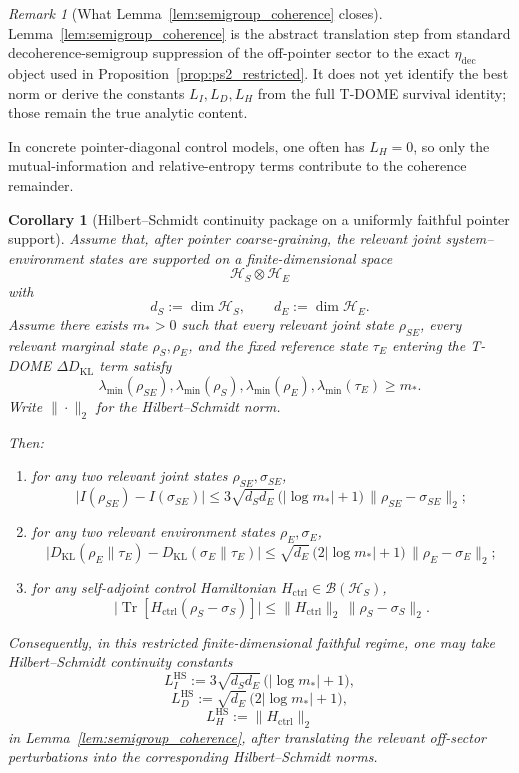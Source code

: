 \documentclass[12pt]{article}
\newtheorem{corollary}[theorem]{Corollary}
\theoremstyle{definition}
\theoremstyle{remark}
\newtheorem{remark}[theorem]{Remark}
\begin{document}
\begin{remark}[What Lemma~\ref{lem:semigroup_coherence} closes]
Lemma~\ref{lem:semigroup_coherence} is the abstract translation step
from standard decoherence-semigroup suppression of the off-pointer
sector to the exact \(\eta_{\mathrm{dec}}\) object used in
Proposition~\ref{prop:ps2_restricted}. It does not yet identify the
best norm or derive the constants \(L_I,L_D,L_H\) from the full
T-DOME survival identity; those remain the true analytic content.

In concrete pointer-diagonal control models, one often has
\(L_H=0\), so only the mutual-information and relative-entropy terms
contribute to the coherence remainder.
\end{remark}

\begin{corollary}[Hilbert--Schmidt continuity package on a uniformly faithful pointer support]\label{cor:hs_package}
Assume that, after pointer coarse-graining, the relevant joint
system--environment states are supported on a finite-dimensional space
\[
\mathcal H_S\otimes \mathcal H_E
\]
with
\[
d_S:=\dim\mathcal H_S,
\qquad
d_E:=\dim\mathcal H_E.
\]
Assume there exists \(m_*>0\) such that every relevant joint state
\(\rho_{SE}\), every relevant marginal state \(\rho_S,\rho_E\), and the
fixed reference state \(\tau_E\) entering the T-DOME
\(\Delta D_{\mathrm{KL}}\) term satisfy
\[
\lambda_{\min}(\rho_{SE}),
\lambda_{\min}(\rho_S),
\lambda_{\min}(\rho_E),
\lambda_{\min}(\tau_E)
\ge
m_*.
\]
Write \(\|\cdot\|_2\) for the Hilbert--Schmidt norm.

Then:
\begin{enumerate}
\item for any two relevant joint states \(\rho_{SE},\sigma_{SE}\),
  \[
  \bigl|I(\rho_{SE})-I(\sigma_{SE})\bigr|
  \le
  3\sqrt{d_Sd_E}\,\bigl(|\log m_*|+1\bigr)\,
  \|\rho_{SE}-\sigma_{SE}\|_2;
  \]
\item for any two relevant environment states \(\rho_E,\sigma_E\),
  \[
  \bigl|D_{\mathrm{KL}}(\rho_E\|\tau_E)
  -D_{\mathrm{KL}}(\sigma_E\|\tau_E)\bigr|
  \le
  \sqrt{d_E}\,\bigl(2|\log m_*|+1\bigr)\,
  \|\rho_E-\sigma_E\|_2;
  \]
  \item for any self-adjoint control Hamiltonian
  \(H_{\mathrm{ctrl}}\in\mathcal B(\mathcal H_S)\),
  \[
  \bigl|\operatorname{Tr}[H_{\mathrm{ctrl}}(\rho_S-\sigma_S)]\bigr|
  \le
  \|H_{\mathrm{ctrl}}\|_2\,
  \|\rho_S-\sigma_S\|_2.
  \]
\end{enumerate}
Consequently, in this restricted finite-dimensional faithful regime, one
may take Hilbert--Schmidt continuity constants
\[
L_I^{\mathrm{HS}}
:=
3\sqrt{d_Sd_E}\,\bigl(|\log m_*|+1\bigr),
\]
\[
L_D^{\mathrm{HS}}
:=
\sqrt{d_E}\,\bigl(2|\log m_*|+1\bigr),
\]
\[
L_H^{\mathrm{HS}}
:=
\|H_{\mathrm{ctrl}}\|_2
\]
in Lemma~\ref{lem:semigroup_coherence}, after translating the relevant
off-sector perturbations into the corresponding Hilbert--Schmidt norms.
\end{corollary}
\end{document}
